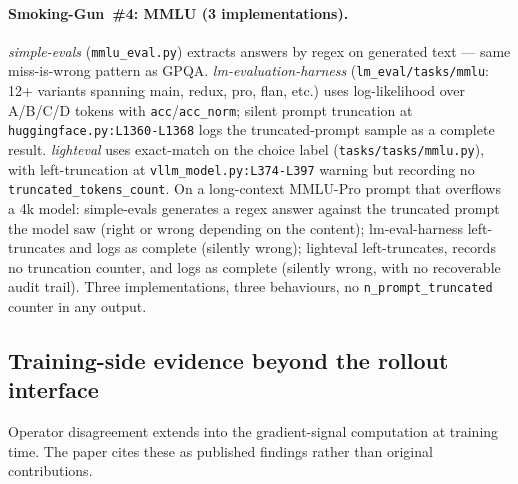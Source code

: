 \documentclass{article}
\begin{document}
\paragraph{Smoking-Gun~\#4: MMLU (3 implementations).}
\emph{simple-evals} (\texttt{mmlu\_eval.py}) extracts answers
by regex on generated text --- same miss-is-wrong pattern as
GPQA. \emph{lm-evaluation-harness}
(\texttt{lm\_eval/tasks/mmlu}: 12+ variants spanning main,
redux, pro, flan, etc.) uses log-likelihood over A/B/C/D
tokens with \texttt{acc}/\texttt{acc\_norm}; silent prompt
truncation at \texttt{huggingface.py:L1360-L1368} logs the
truncated-prompt sample as a complete result.
\emph{lighteval} uses exact-match on the choice label
(\texttt{tasks/tasks/mmlu.py}), with left-truncation at
\texttt{vllm\_model.py:L374-L397} warning but recording no
\texttt{truncated\_tokens\_count}. On a long-context MMLU-Pro
prompt that overflows a 4k model: simple-evals generates a
regex answer against the truncated prompt the model saw
(right or wrong depending on the content);
lm-eval-harness left-truncates and logs as complete (silently
wrong); lighteval left-truncates, records no truncation
counter, and logs as complete (silently wrong, with no
recoverable audit trail). Three implementations, three
behaviours, no \texttt{n\_prompt\_truncated} counter in any
output.

\subsection{Training-side evidence beyond the rollout interface}
\label{app:vc:training}

Operator disagreement extends into the gradient-signal
computation at training time. The paper cites these as
published findings rather than original contributions.
\end{document}
